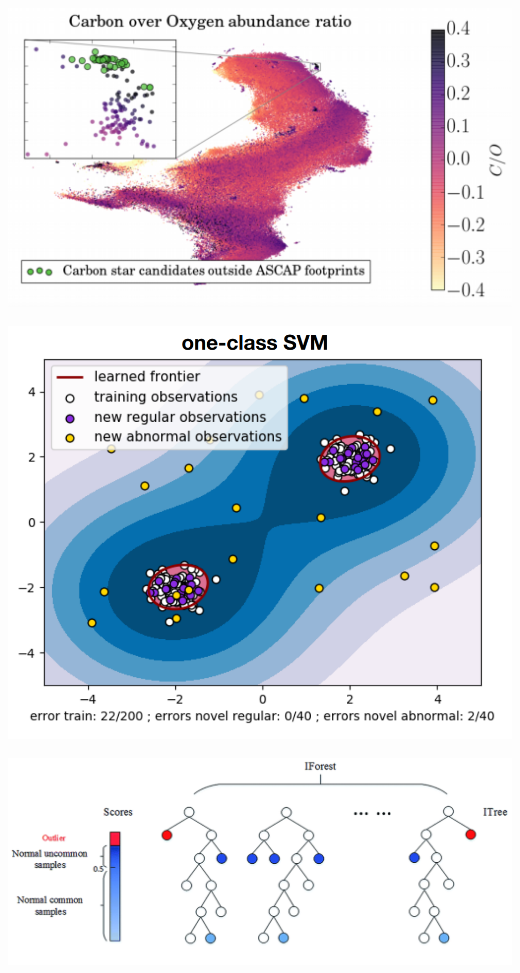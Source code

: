 \documentclass[20pt,landscape,footrule,headrule]{foils}
\begin{document}
\newpage
\begin{center}
\includegraphics[width=\textwidth]{Images/COar.png}
\end{center}

\newpage
\begin{center}
\includegraphics[width=\textwidth]{Images/1SVM.png}
\end{center}


\newpage
\begin{center}
\includegraphics[width=\textwidth]{Images/IsoForest.png}
\end{center}
\end{document}
